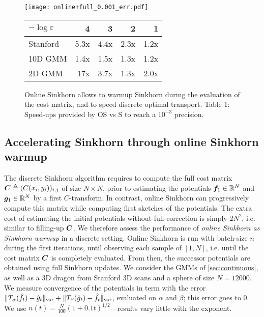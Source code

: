 \begin{figure}[t]
    \begin{minipage}{.7\textwidth}
    \texttt{[image: online+full\_0.001\_err.pdf]}
    \end{minipage}%
    \hfill
    \begin{minipage}{.3\textwidth}
        \tiny
        \begin{tabular}{lrrrr}
            \toprule
            $- \log \varepsilon$
            &  4 & 3 & 2 & 1 \\
            \midrule
            Stanford      &     5.3x &    4.4x &    2.3x &    1.2x \\
            10D GMM     &     1.4x &    1.5x &    1.3x &    1.2x \\
            2D GMM      &    17x &    3.7x &    1.3x &    2.0x \\
            \bottomrule
            \end{tabular}
    \end{minipage}
    \caption{Online Sinkhorn allows to warmup Sinkhorn during the evaluation of the cost matrix, and to speed discrete optimal transport. Table 1: Speed-ups provided by OS vs S to reach a $10^{-3}$ precision.}
    \label{fig:warmup}
\end{figure}


\subsection{Accelerating Sinkhorn through online Sinkhorn warmup}\label{sec:accelerating}

The discrete Sinkhorn algorithm requires to compute the full cost matrix $\bm{C}
\triangleq (C(x_i,y_i))_{i,j}$  of size $N \times N$, prior to estimating the
potentials $\bm{f}_1 \in \mathbb{R}^N$ and $\bm{g}_1 \in \mathbb{R}^N$ by a first $C$-transform. In
contrast, online Sinkhorn can progressively compute this matrix while computing
first sketches of the potentials. The extra cost of estimating the initial potentials
without full-correction is simply $2 N^2$, i.e. similar to filling-up $\bm{C}$. We
therefore assess the performance of \textit{online Sinkhorn as Sinkhorn warmup}
in a discrete setting. Online Sinkhorn is run with batch-size $n$ during the
first iterations, until observing each sample of $[1,N]$, i.e. until the cost
matrix $\bm{C}$ is completely evaluated. From then, the
successor potentials are obtained using full Sinkhorn updates. We consider the
GMMs of \autoref{sec:continuous}, as well as a 3D dragon from Stanford 3D scans
\cite{turk1994zippered} and a sphere of size $N=12000$. We measure
convergence of the potentials in term with the error $\Vert
T_{\alpha}(\hat f_t) - \hat g_t \Vert_{\text{\upshape var}} + \Vert T_{\beta}(\hat
g_t) - \hat f_t \Vert_{\text{\upshape var}}$, evaluated on $\alpha$ and $\beta$; this error
goes to $0$. We use $n(t) = \frac{N}{100} (1+0.1t)^{1/2}$---results vary little with the exponent.


